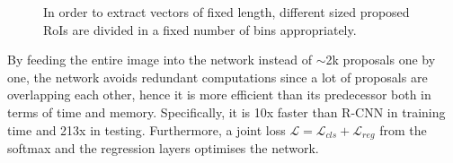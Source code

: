 \begin{figure}[!htb]
  \centering
  \caption{In order to extract vectors of fixed length, different sized proposed RoIs are divided in a fixed number of bins appropriately.}
  \label{fig4}
\end{figure}

By feeding the entire image into the network instead of $\sim$2k proposals one by one, the network avoids redundant computations since a lot of proposals are overlapping each other, hence it is more efficient than its predecessor both in terms of time and memory. Specifically, it is 10x faster than R-CNN in training time and 213x in testing. Furthermore, a joint loss $\mathcal{L}=\mathcal{L}_{cls}+\mathcal{L}_{reg}$ from the softmax and the regression layers optimises the network.

